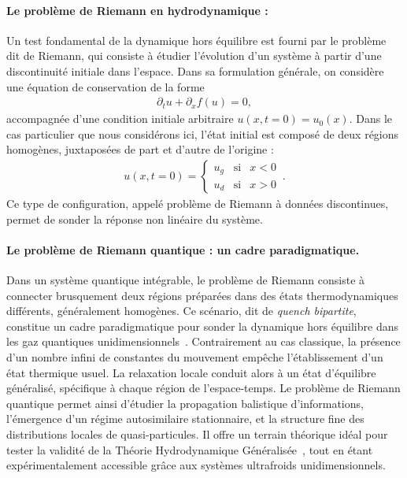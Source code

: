 \paragraph{Le problème de Riemann en hydrodynamique :}
Un test fondamental de la dynamique hors équilibre est fourni par le problème dit de Riemann, qui consiste à étudier l’évolution d’un système à partir d'une discontinuité initiale dans l'espace. Dans sa formulation générale, on considère une équation de conservation de la forme
\begin{eqnarray}\label{chap6:eq.Rieman.1}
\partial_t u + \partial_x f(u) = 0,
\end{eqnarray}
accompagnée d'une condition initiale arbitraire $u(x, t = 0) = u_0(x)$.
Dans le cas particulier que nous considérons ici, l’état initial est composé de deux régions homogènes, juxtaposées de part et d’autre de l’origine :
\begin{eqnarray}\label{chap6:eq.Rieman.cond.1}
	u( x, t=0 ) = \left \{\begin{array}{rcl} u_g & \text{si} & x<0 \\ u_d & \text{si} & x > 0 \end{array} \right. \,.
\end{eqnarray}
Ce type de configuration, appelé problème de Riemann à données discontinues, permet de sonder la réponse non linéaire du système.

\paragraph{Le problème de Riemann quantique : un cadre paradigmatique.}

Dans un système quantique intégrable, le problème de Riemann consiste à connecter brusquement deux régions préparées dans des états thermodynamiques différents, généralement homogènes. Ce scénario, dit de \emph{quench bipartite}, constitue un cadre paradigmatique pour sonder la dynamique hors équilibre dans les gaz quantiques unidimensionnels~\cite{doyon2017lecture,bertini2016transport}. Contrairement au cas classique, la présence d’un nombre infini de constantes du mouvement empêche l’établissement d’un état thermique usuel. La relaxation locale conduit alors à un état d’équilibre généralisé, spécifique à chaque région de l’espace-temps. Le problème de Riemann quantique permet ainsi d’étudier la propagation balistique d’informations, l’émergence d’un régime autosimilaire stationnaire, et la structure fine des distributions locales de quasi-particules. Il offre un terrain théorique idéal pour tester la validité de la Théorie Hydrodynamique Généralisée~\cite{castro2016emergent,doyon2017ghd}, tout en étant expérimentalement accessible grâce aux systèmes ultrafroids unidimensionnels.

